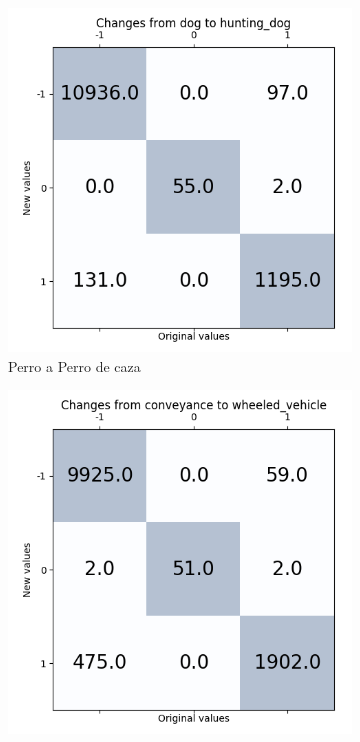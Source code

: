 \documentclass[12,twoside]{TFG-GM}
\theoremstyle{definition}
\theoremstyle{remark}
\begin{document}
\begin{figure}[ht] 
	\centering
	\begin{subfigure}[b]{0.3\textwidth}
		\includegraphics[width=\textwidth] {Images/plots/25/matrices/MatrixDogHunting.png}
		\caption{Perro a Perro de caza \label{fig:MatrixDogHunting}}
	\end{subfigure}
	\begin{subfigure}[b]{0.3\textwidth}
		\includegraphics[width=\textwidth]  {Images/plots/25/matrices/matrixConveyanceWheel.png}

\end{subfigure}
\end{figure}
\end{document}
